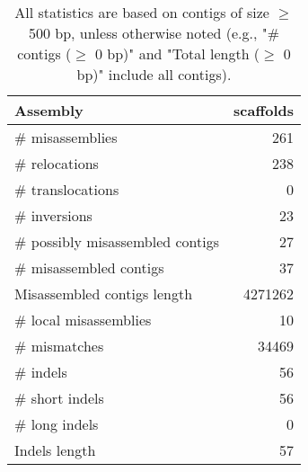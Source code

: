 \documentclass[12pt,a4paper]{article}
\begin{document}
\begin{table}[ht]
\begin{center}
\caption{All statistics are based on contigs of size $\geq$ 500 bp, unless otherwise noted (e.g., "\# contigs ($\geq$ 0 bp)" and "Total length ($\geq$ 0 bp)" include all contigs).}
\begin{tabular}{|l*{1}{|r}|}
\hline
Assembly & scaffolds \\ \hline
\# misassemblies & 261 \\ \hline
\hspace{5mm}\# relocations & 238 \\ \hline
\hspace{5mm}\# translocations & 0 \\ \hline
\hspace{5mm}\# inversions & 23 \\ \hline
\# possibly misassembled contigs & 27 \\ \hline
\# misassembled contigs & 37 \\ \hline
Misassembled contigs length & 4271262 \\ \hline
\# local misassemblies & 10 \\ \hline
\# mismatches & 34469 \\ \hline
\# indels & 56 \\ \hline
\hspace{5mm}\# short indels & 56 \\ \hline
\hspace{5mm}\# long indels & 0 \\ \hline
Indels length & 57 \\ \hline
\end{tabular}
\end{center}
\end{table}
\end{document}
